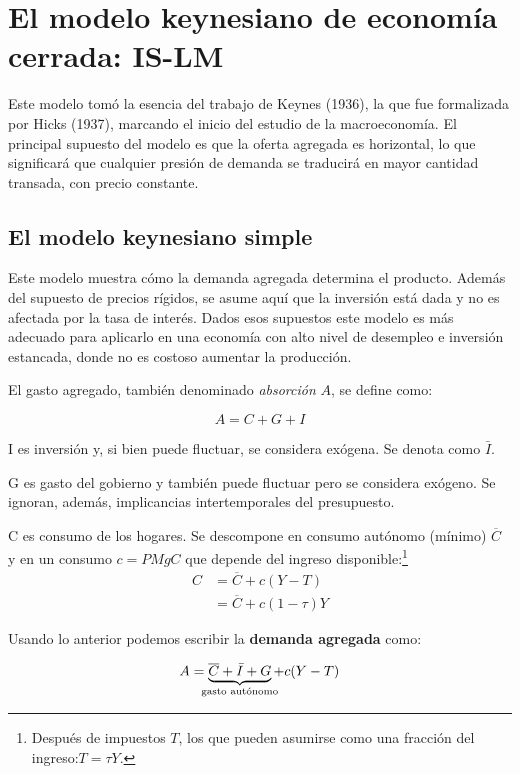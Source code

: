 \documentclass[DeGregorioResumen]{subfiles}
\begin{document}
\setcounter{section}{18}
\section{El modelo keynesiano de economía cerrada: IS-LM}
Este modelo tomó la esencia del trabajo de Keynes (1936), la que fue formalizada por Hicks (1937), marcando el inicio del estudio de la macroeconomía. El principal supuesto del modelo es que la oferta agregada es horizontal, lo que significará que cualquier presión de demanda se traducirá en mayor cantidad transada, con precio constante.

\subsection{El modelo keynesiano simple}

Este modelo muestra cómo la demanda agregada determina el producto. Además del supuesto de precios rígidos, se asume aquí que la inversión está dada y no es afectada por la tasa de interés. Dados esos supuestos este modelo es más adecuado para aplicarlo en una economía con alto nivel de desempleo e inversión estancada, donde no es costoso aumentar la producción.

El gasto agregado, también denominado \emph{absorción} $A$, se define como:

\begin{equation*}
A=C+G+I
\end{equation*}
\begin{where}
\item[I] es inversión y, si bien puede fluctuar, se considera exógena. Se denota como $\bar{I}$.
\item[G] es gasto del gobierno y también puede fluctuar pero se considera exógeno. Se ignoran, además, implicancias intertemporales del presupuesto.
\item[C] es consumo de los hogares. Se descompone en consumo autónomo (mínimo) $\overline{C}$ y en un consumo $c=PMgC$ que depende del ingreso disponible:\footnote{Después de impuestos $T$, los que pueden asumirse como una fracción del ingreso:$T=\tau Y$.}
\begin{align*}
C &= \overline{C}+c(Y-T) \\
&= \overline{C}+c(1-\tau)Y
\end{align*}
\end{where}

Usando lo anterior podemos escribir la \textbf{demanda agregada} como:

\begin{equation}
A=\underbrace{\overline{C}+\bar{I}+G}_{\mathclap{\text{gasto autónomo}}}+c(Y-T)
\label{eq:consumo_keynesiano_IS}
\end{equation}
\end{document}
